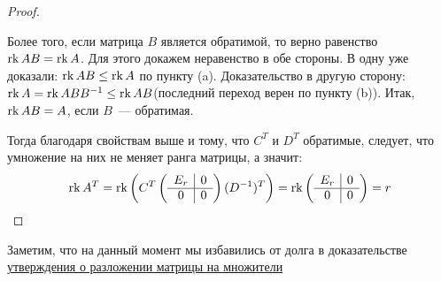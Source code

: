 \begin{proof}
\begin{enumerate}
\begin{enumerate}
            \end{enumerate}
            Более того, если матрица $B$ является обратимой, то верно равенство $\operatorname{rk} AB = \operatorname{rk} A$.
            Для этого докажем неравенство в обе стороны. В одну уже доказали: $\operatorname{rk} AB \le \operatorname{rk} A$ по пункту (a).
            Доказательство в другую сторону: $\operatorname{rk} A = \operatorname{rk} ABB^{-1} \le \operatorname{rk} AB$(последний переход верен по пункту (b)).
            Итак, $\operatorname{rk} AB = A$, если $B$~--- обратимая.
    \end{enumerate}
    Тогда благодаря свойствам выше и тому, что $C^T$ и $D^T$ обратимые, следует, что умножение на них не 
    меняет ранга матрицы, а значит:
    \[
        \operatorname{rk} A^T = \operatorname{rk} \left(C^T
        \left(\begin{array}{c|c}
                E_r & 0\\
                \hline
                0 & 0
        \end{array}\right) (D^{-1})^T\right) = 
        \operatorname{rk} \left(\begin{array}{c|c}
                E_r & 0\\
                \hline
                0 & 0
        \end{array}\right) = r
    \]
\end{proof}
\begin{remark}
    Заметим, что на данный момент мы избавились от долга в 
    доказательстве 
    \hyperref[stm:О разложении матрицы на множители]{утверждения о разложении матрицы на множители}
\end{remark}
